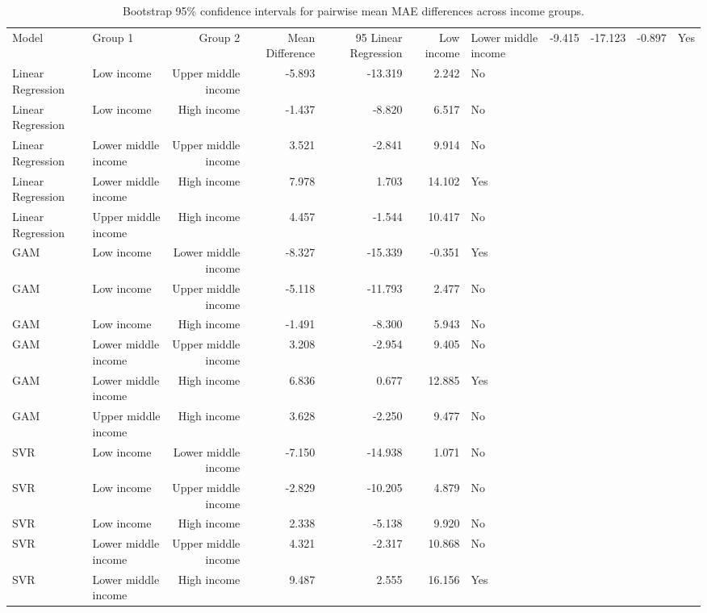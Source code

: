 \begin{table}[htbp]
    \centering
    \small
    \caption{Bootstrap 95\% confidence intervals for pairwise mean MAE differences across income groups.}
    \label{tab:sq2_bootstrap_ci}
    \begin{tabular}{llrrrr}
        \toprule
        Model & Group 1 & Group 2 & Mean Difference & 95%
        \midrule
        Linear Regression & Low income & Lower middle income & -9.415 & -17.123 & -0.897 & Yes \\
        Linear Regression & Low income & Upper middle income & -5.893 & -13.319 & 2.242 & No \\
        Linear Regression & Low income & High income & -1.437 & -8.820 & 6.517 & No \\
        Linear Regression & Lower middle income & Upper middle income & 3.521 & -2.841 & 9.914 & No \\
        Linear Regression & Lower middle income & High income & 7.978 & 1.703 & 14.102 & Yes \\
        Linear Regression & Upper middle income & High income & 4.457 & -1.544 & 10.417 & No \\
        \midrule
        GAM & Low income & Lower middle income & -8.327 & -15.339 & -0.351 & Yes \\
        GAM & Low income & Upper middle income & -5.118 & -11.793 & 2.477 & No \\
        GAM & Low income & High income & -1.491 & -8.300 & 5.943 & No \\
        GAM & Lower middle income & Upper middle income & 3.208 & -2.954 & 9.405 & No \\
        GAM & Lower middle income & High income & 6.836 & 0.677 & 12.885 & Yes \\
        GAM & Upper middle income & High income & 3.628 & -2.250 & 9.477 & No \\
        \midrule
        SVR & Low income & Lower middle income & -7.150 & -14.938 & 1.071 & No \\
        SVR & Low income & Upper middle income & -2.829 & -10.205 & 4.879 & No \\
        SVR & Low income & High income & 2.338 & -5.138 & 9.920 & No \\
        SVR & Lower middle income & Upper middle income & 4.321 & -2.317 & 10.868 & No \\
        SVR & Lower middle income & High income & 9.487 & 2.555 & 16.156 & Yes \\

\end{tabular}
\end{table}
